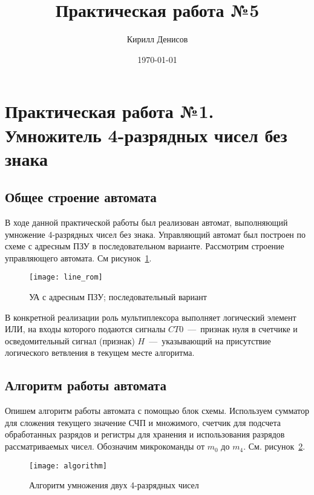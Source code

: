 \documentclass[a4paper,14pt]{extarticle}
\author{Кирилл Денисов}
\title{Практическая работа №5}
\date{\today}
\newcommand{\pathToCommonFolder}{../../Common}
\begin{document}
	\thispagestyle{empty}
	
	
	
	\newpage
	\tableofcontents
	\newpage
	
\section{Практическая работа №1. \\Умножитель 4-разрядных чисел без знака}
\subsection{Общее строение автомата}
В ходе данной практической работы был реализован автомат, выполняющий умножение 4-разрядных чисел без знака. Управляющий автомат был построен по схеме с адресным ПЗУ в последовательном варианте. Рассмотрим строение управляющего автомата. См рисунок~\ref{img:scheme1}.

\begin{figure}[h!]
	\begin{center}
		\texttt{[image: line\_rom]}
		\caption{УА с адресным ПЗУ; последовательный вариант}
		\label{img:scheme1}
	\end{center}	
\end{figure}

В конкретной реализации роль мультиплексора выполняет логический элемент ИЛИ, на входы которого подаются сигналы $CT0$~---~признак нуля в счетчике и осведомительный сигнал (признак) $H$~---~указывающий на присутствие логического ветвления в текущем месте алгоритма.

\subsection{Алгоритм работы автомата}
Опишем алгоритм работы автомата с помощью блок схемы. Используем сумматор для сложения текущего значение СЧП и множимого, счетчик для подсчета обработанных разрядов и регистры для хранения и использования разрядов рассматриваемых чисел. Обозначим микрокоманды от $m_0$ до $m_4$. См. рисунок~\ref{img:algorithm1}.\vspace{2ex}

\begin{figure}[h!]
	\centering
	\texttt{[image: algorithm]}
	\caption {Алгоритм умножения двух 4-разрядных чисел}
	\label{img:algorithm1}
\end{figure}
\end{document}
